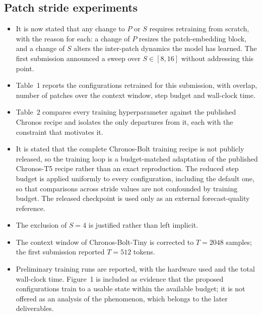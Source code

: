 \subsection{Patch stride experiments}
\begin{itemize}
  \item It is now stated that any change to $P$ or $S$ requires retraining from
        scratch, with the reason for each: a change of $P$ resizes the
        patch-embedding block, and a change of $S$ alters the inter-patch
        dynamics the model has learned. The first submission announced a sweep
        over $S \in [8,16]$ without addressing this point.
  \item Table~1 reports the configurations retrained for this submission,
        with overlap, number of patches over the context window, step budget
        and wall-clock time.
  \item Table~2 compares every training hyperparameter against the published
        Chronos recipe and isolates the only departures from it, each with the
        constraint that motivates it.
  \item It is stated that the complete Chronos-Bolt training recipe is not
        publicly released, so the training loop is a budget-matched adaptation
        of the published Chronos-T5 recipe rather than an exact reproduction.
        The reduced step budget is applied uniformly to every configuration,
        including the default one, so that comparisons across stride values are
        not confounded by training budget. The released checkpoint is used only
        as an external forecast-quality reference.
  \item The exclusion of $S=4$ is justified rather than left implicit.
  \item The context window of Chronos-Bolt-Tiny is corrected to $T=2048$
        samples; the first submission reported $T=512$ tokens.
  \item Preliminary training runs are reported, with the hardware used and the
        total wall-clock time. Figure~1 is included as evidence that the
        proposed configurations train to a usable state within the available
        budget; it is not offered as an analysis of the phenomenon, which
        belongs to the later deliverables.
\end{itemize}

